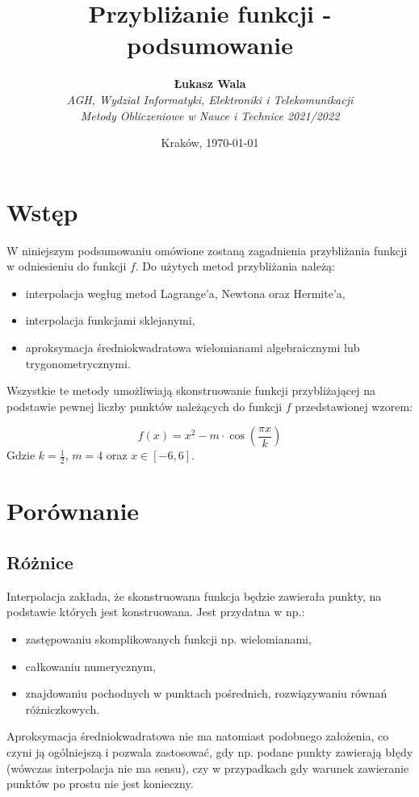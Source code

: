 \documentclass{article}
\title{Przybliżanie funkcji - podsumowanie}
\author{\textbf{Łukasz Wala}\\
    \textit{AGH, Wydział Informatyki, Elektroniki i Telekomunikacji} \\
    \textit{Metody Obliczeniowe w Nauce i Technice 2021/2022}}
\date{Kraków, \today}
\begin{document}
\maketitle

\section{Wstęp}
W niniejszym podsumowaniu omówione zostaną zagadnienia przybliżania funkcji w odniesieniu do funkcji $f$.
Do użytych metod przybliżania należą:
\begin{itemize}
    \item
    interpolacja wegług metod Lagrange'a, Newtona oraz Hermite'a,
    \item
    interpolacja funkcjami sklejanymi,
    \item
    aproksymacja średniokwadratowa wielomianami algebraicznymi lub trygonometrycznymi.
\end{itemize}

Wszystkie te metody umożliwiają skonstruowanie funkcji przybliżającej na podstawie pewnej liczby punktów 
należących do funkcji $f$ przedstawionej wzorem:

\[f(x)=x^2-m\cdot\cos\left(\frac{\pi x}{k}\right)\]
Gdzie $k=\frac{1}{2}$, $m=4$ oraz $x\in [-6,6]$.

\section{Porównanie}
\subsection{Różnice}
Interpolacja zakłada, że skonstruowana funkcja będzie zawierała punkty, na podstawie których jest konstruowana.
Jest przydatna w np.:
\begin{itemize}
    \item
    zastępowaniu skomplikowanych funkcji np. wielomianami,
    \item
    całkowaniu numerycznym,
    \item
    znajdowaniu pochodnych w punktach pośrednich, rozwiązywaniu równań różniczkowych.
\end{itemize}

Aproksymacja średniokwadratowa nie ma natomiast podobnego założenia, co czyni ją ogólniejszą i pozwala zastosować, gdy
np. podane punkty zawierają błędy (wówczas interpolacja nie ma sensu), czy w przypadkach gdy warunek zawieranie punktów
po prostu nie jest konieczny.
\end{document}
